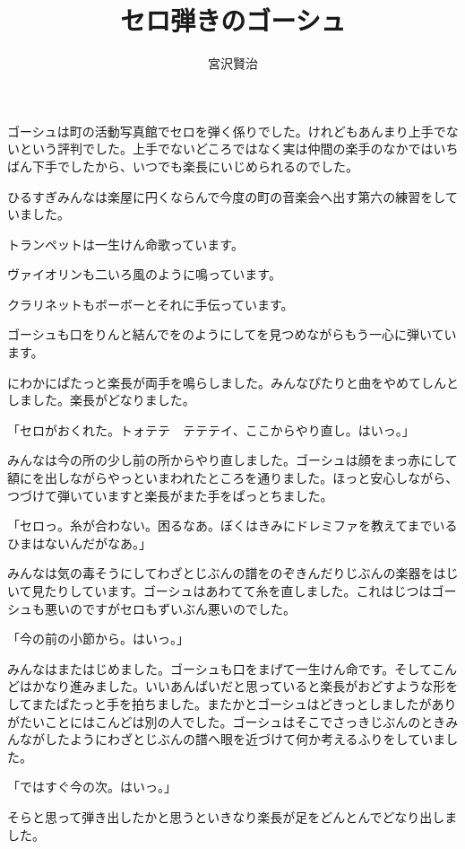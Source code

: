 \documentclass[uplatex,a5paper,twoside]{jsarticle}
\title{セロ弾きのゴーシュ}
\author{宮沢賢治}
\begin{document}
\maketitle

ゴーシュは町の活動写真館でセロを弾く係りでした。けれどもあんまり上手でないという評判でした。上手でないどころではなく実は仲間の楽手のなかではいちばん下手でしたから、いつでも楽長にいじめられるのでした。

ひるすぎみんなは楽屋に円くならんで今度の町の音楽会へ出す第六の練習をしていました。

トランペットは一生けん命歌っています。

ヴァイオリンも二いろ風のように鳴っています。

クラリネットもボーボーとそれに手伝っています。

ゴーシュも口をりんと結んでをのようにしてを見つめながらもう一心に弾いています。

にわかにぱたっと楽長が両手を鳴らしました。みんなぴたりと曲をやめてしんとしました。楽長がどなりました。

「セロがおくれた。トォテテ　テテテイ、ここからやり直し。はいっ。」

みんなは今の所の少し前の所からやり直しました。ゴーシュは顔をまっ赤にして額にを出しながらやっといまわれたところを通りました。ほっと安心しながら、つづけて弾いていますと楽長がまた手をぱっとちました。

「セロっ。糸が合わない。困るなあ。ぼくはきみにドレミファを教えてまでいるひまはないんだがなあ。」

みんなは気の毒そうにしてわざとじぶんの譜をのぞきんだりじぶんの楽器をはじいて見たりしています。ゴーシュはあわてて糸を直しました。これはじつはゴーシュも悪いのですがセロもずいぶん悪いのでした。

「今の前の小節から。はいっ。」

みんなはまたはじめました。ゴーシュも口をまげて一生けん命です。そしてこんどはかなり進みました。いいあんばいだと思っていると楽長がおどすような形をしてまたぱたっと手を拍ちました。またかとゴーシュはどきっとしましたがありがたいことにはこんどは別の人でした。ゴーシュはそこでさっきじぶんのときみんながしたようにわざとじぶんの譜へ眼を近づけて何か考えるふりをしていました。

「ではすぐ今の次。はいっ。」

そらと思って弾き出したかと思うといきなり楽長が足をどんとんでどなり出しました。
\end{document}
